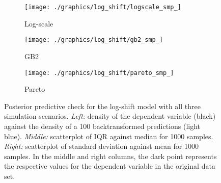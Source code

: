 \begin{figure}
    \begin{subfigure}{\textwidth}
        \texttt{[image: ./graphics/log\_shift/logscale\_smp\_]}
        \caption{Log-scale}
    \end{subfigure}
    \newline
    \begin{subfigure}{\textwidth}
        \texttt{[image: ./graphics/log\_shift/gb2\_smp\_]}
        \caption{GB2}
    \end{subfigure}
    \newline
    \begin{subfigure}{\textwidth}
        \texttt{[image: ./graphics/log\_shift/pareto\_smp\_]}
        \caption{Pareto}
    \end{subfigure}
    \caption[Posterior predictive check for the log-shift model with all three simulation scenarios.]{Posterior predictive check for the log-shift model with all three simulation scenarios. \textit{Left:} density of the dependent variable (black) against the  density of a 100 backtransformed predictions (light blue). \textit{Middle:} scatterplot of IQR against median for 1000 samples. \textit{Right:} scatterplot of standard deviation against mean for 1000 samples. In the middle and right columns, the dark point represents the respective values for the dependent variable in the original data set.}
    \label{fig:ppc_logshift}
\end{figure}

